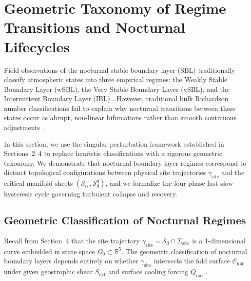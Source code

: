\section{Geometric Taxonomy of Regime Transitions and Nocturnal Lifecycles}
\label{sec:taxonomy}

Field observations of the nocturnal stable boundary layer (SBL) traditionally classify atmospheric states into three empirical regimes: the Weakly Stable Boundary Layer (wSBL), the Very Stable Boundary Layer (vSBL), and the Intermittent Boundary Layer (IBL) \citep{Mahrt1998, Acevedo2006, Sun2012}. However, traditional bulk Richardson number classifications fail to explain why nocturnal transitions between these states occur as abrupt, non-linear bifurcations rather than smooth continuous adjustments \citep{Banta2007}.

In this section, we use the singular perturbation framework established in Sections~2--4 to replace heuristic classifications with a rigorous geometric taxonomy. We demonstrate that nocturnal boundary-layer regimes correspond to distinct topological configurations between physical site trajectories $\gamma_{\mathrm{site}}$ and the critical manifold sheets $(\mathcal{S}_0^+, \mathcal{S}_0^0)$, and we formalize the four-phase fast-slow hysteresis cycle governing turbulent collapse and recovery.

\subsection{Geometric Classification of Nocturnal Regimes}

Recall from Section~4 that the site trajectory $\gamma_{\mathrm{site}} = \mathcal{S}_0 \cap \Sigma_{\mathrm{site}}$ is a 1-dimensional curve embedded in state space $\Omega_0 \subset \mathbb{R}^5$. The geometric classification of nocturnal boundary layers depends entirely on whether $\gamma_{\mathrm{site}}$ intersects the fold surface $\mathcal{C}_{\mathrm{fold}}$ under given geostrophic shear $S_{\mathrm{ext}}$ and surface cooling forcing $Q_{\mathrm{rad}}$ \citep{VanDeWiel2007, VanDeWiel2012}.

